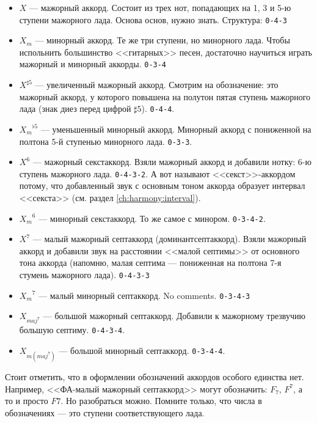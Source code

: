 \begin{itemize}
    \item $X$ --- мажорный аккорд. Состоит из трех нот, попадающих на 1, 3 и 5-ю ступени мажорного лада. Основа основ, нужно знать. Структура: \texttt{0-4-3}
    \item $X_m$ --- минорный аккорд. Те же три ступени, но минорного лада. Чтобы испольнить большинство <<гитарных>> песен, достаточно научиться играть мажорный и минорный аккорды. \texttt{0-3-4}

    \item $X^{\sharp 5}$ --- увеличенный мажорный аккорд. Смотрим на обозначение: это мажорный аккорд, у которого повышена на полутон пятая ступень мажорного лада (знак диез перед цифрой $\sharp 5$). \texttt{0-4-4}.
    \item ${X_m}^{\flat 5}$ --- уменьшенный минорный аккорд. Минорный аккорд с пониженной на полтона 5-й ступенью минорного лада. \texttt{0-3-3}.

    \item $X^6$ --- мажорный секстаккорд. Взяли мажорный аккорд и добавили нотку: 6-ю ступень мажорного лада. \texttt{0-4-3-2}. А вот называют <<секст>>-аккордом потому, что добавленный звук с основным тоном аккорда образует интервал <<секста>> (см. раздел \ref{ch:harmony:interval}).
    \item ${X_m}^6$ --- минорный секстаккорд. То же самое с минором. \texttt{0-3-4-2}.

    \item $X^7$ --- малый мажорный септаккорд (доминантсептаккорд). Взяли мажорный аккорд и добавили звук на расстоянии <<малой септимы>> от основного тона аккорда (напомню, малая септима --- пониженная на полтона 7-я стумень мажорного лада). \texttt{0-4-3-3}
    \item ${X_m}^7$ --- малый минорный септаккорд. No comments. \texttt{0-3-4-3}

    \item $X_{maj^7}$ --- большой мажорный септаккорд. Добавили к мажорному трезвучию большую септиму. \texttt{0-4-3-4}.
    \item $X_{m(maj^7)}$ --- большой минорный септаккорд. \texttt{0-3-4-4}.
\end{itemize}

Стоит отметить, что в оформлении обозначений аккордов особого единства нет. Например, <<ФА-малый мажорный септаккорд>> могут обозначить: $F_7$, $F^7$, а то и просто $F7$. Но разобраться можно. Помните только, что числа в обозначениях --- это ступени соответствующего лада.


